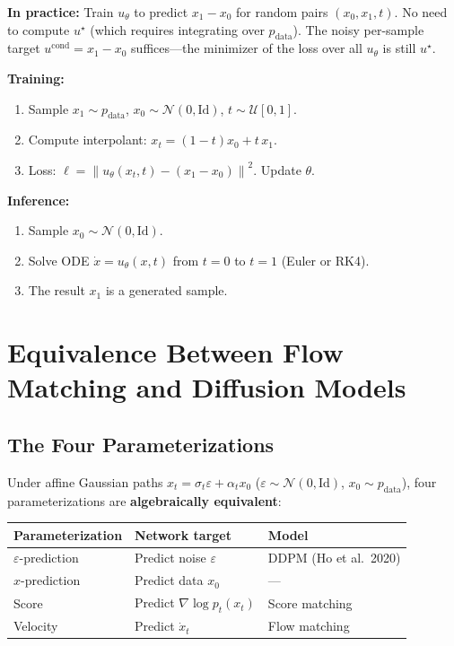 \documentclass[11pt, a4paper]{article}
\newcommand{\Id}{\mathrm{Id}}
\newcommand{\pdata}{p_{\mathrm{data}}}
\newcommand{\grad}{\nabla}
\newcommand{\norm}[1]{\left\|#1\right\|}
\theoremstyle{plain}
\theoremstyle{definition}
\theoremstyle{remark}
\begin{document}
\begin{intubox}
\textbf{In practice:} Train $u_\theta$ to predict $x_1 - x_0$ for random pairs $(x_0, x_1, t)$. No need to compute $u^\star$ (which requires integrating over $\pdata$). The noisy per-sample target $u^{\mathrm{cond}} = x_1 - x_0$ suffices---the minimizer of the loss over all $u_\theta$ is still $u^\star$.
\end{intubox}

\begin{algobox}
\textbf{Training:}
\begin{enumerate}
  \item Sample $x_1 \sim \pdata$, $x_0 \sim \mathcal{N}(0,\Id)$, $t \sim \mathcal{U}[0,1]$.
  \item Compute interpolant: $x_t = (1-t)x_0 + t\,x_1$.
  \item Loss: $\ell = \norm{u_\theta(x_t, t) - (x_1 - x_0)}^2$. Update $\theta$.
\end{enumerate}
\textbf{Inference:}
\begin{enumerate}
  \item Sample $x_0 \sim \mathcal{N}(0,\Id)$.
  \item Solve ODE $\dot{x} = u_\theta(x,t)$ from $t=0$ to $t=1$ (Euler or RK4).
  \item The result $x_1$ is a generated sample.
\end{enumerate}
\end{algobox}

\section{Equivalence Between Flow Matching and Diffusion Models}
\label{sec:equivalence}

\subsection{The Four Parameterizations}

Under affine Gaussian paths $x_t = \sigma_t \varepsilon + \alpha_t x_0$ ($\varepsilon \sim \mathcal{N}(0,\Id)$, $x_0 \sim \pdata$), four parameterizations are \textbf{algebraically equivalent}:

\begin{center}
\begin{tabular}{lll}
\toprule
\textbf{Parameterization} & \textbf{Network target} & \textbf{Model} \\
\midrule
$\varepsilon$-prediction & Predict noise $\varepsilon$ & DDPM (Ho et al.\ 2020) \\
$x$-prediction & Predict data $x_0$ & --- \\
Score & Predict $\grad \log p_t(x_t)$ & Score matching \\
Velocity & Predict $\dot{x}_t$ & Flow matching \\
\bottomrule
\end{tabular}
\end{center}
\end{document}

